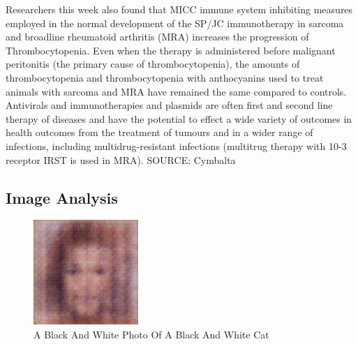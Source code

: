 \documentclass{article}%
\begin{document}
Researchers this week also found that MICC immune system inhibiting measures employed in the normal development of the SP/JC immunotherapy in sarcoma and broadline rheumatoid arthritis (MRA) increases the progression of Thrombocytopenia. Even when the therapy is administered before malignant peritonitis (the primary cause of thrombocytopenia), the amounts of thrombocytopenia and thrombocytopenia with anthocyanins used to treat animals with sarcoma and MRA have remained the same compared to controls.\newline%
Antivirals and immunotherapies and plasmids are often first and second line therapy of diseases and have the potential to effect a wide variety of outcomes in health outcomes from the treatment of tumours and in a wider range of infections, including multidrug{-}resistant infections (multitrug therapy with 10{-}3 receptor IRST is used in MRA).\newline%
SOURCE: Cymbalta

%
\subsection{Image Analysis}%
\label{subsec:ImageAnalysis}%


\begin{figure}[h!]%
\centering%
\includegraphics[width=150px]{500_fake_images/samples_5_415.png}%
\caption{A Black And White Photo Of A Black And White Cat}%
\end{figure}

%
\end{document}
